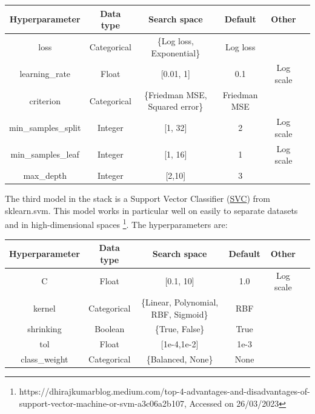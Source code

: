 \documentclass[11pt]{article}
\begin{document}
\vspace{-0.3cm}
\begin{table}[h]
\begin{tabular}{ | c | c | c | c | c | c | }
 \hline
  Hyperparameter & Data type & Search space & Default & Other \\
 \hline
 loss & Categorical & \{Log loss, Exponential\} & Log loss &  \\ 
 learning\_rate & Float & [0.01, 1] & 0.1 & Log scale  \\ 
 criterion & Categorical & \{Friedman MSE, Squared error\} & Friedman MSE &   \\ 
 min\_samples\_split & Integer & [1, 32] & 2 & Log scale \\ 
 min\_samples\_leaf & Integer & [1, 16] & 1 & Log scale  \\
 max\_depth  & Integer & [2,10] & 3 &  \\ 
 \hline
\end{tabular}
\end{table}
\vspace{-0.3cm}

The third model in the stack is a Support Vector Classifier (\href{https://scikit-learn.org/stable/modules/generated/sklearn.svm.SVC.html#sklearn.svm.SVC}{SVC}) from sklearn.svm. This model works in particular well on easily to separate datasets and in high-dimensional spaces \footnote{https://dhirajkumarblog.medium.com/top-4-advantages-and-disadvantages-of-support-vector-machine-or-svm-a3c06a2b107, Accessed on 26/03/2023}. The hyperparameters are:

\vspace{-0.3cm}
\begin{table}[H]
\begin{tabular}{ | c | c | c | c | c | c | }
 \hline
  Hyperparameter & Data type & Search space & Default & Other \\
 \hline
 C & Float & [0.1, 10]  & 1.0 & Log scale \\ 
 kernel & Categorical & \{Linear, Polynomial, RBF, Sigmoid\}  & RBF &   \\ 
 shrinking & Boolean & \{True, False\} & True &  \\ 
 tol & Float & [1e-4,1e-2] & 1e-3 &  \\ 
 class\_weight & Categorical & \{Balanced, None\}  & None &  \\ 
 \hline
\end{tabular}
\end{table}
\end{document}
